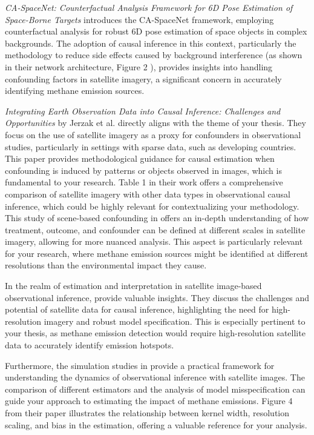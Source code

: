 \textit{CA-SpaceNet: Counterfactual Analysis Framework for 6D Pose Estimation of Space-Borne Targets} \cite{wang_ca-spacenet_2022} introduces the CA-SpaceNet framework, employing counterfactual analysis for robust 6D pose estimation of space objects in complex backgrounds. The adoption of causal inference in this context, particularly the methodology to reduce side effects caused by background interference (as shown in their network architecture, Figure 2 \cite[Figure 2]{wang_ca-spacenet_2022}), provides insights into handling confounding factors in satellite imagery, a significant concern in accurately identifying methane emission sources.

\textit{Integrating Earth Observation Data into Causal Inference: Challenges and Opportunities} by Jerzak et al. \cite{jerzak_integrating_2023} directly aligns with the theme of your thesis. They focus on the use of satellite imagery as a proxy for confounders in observational studies, particularly in settings with sparse data, such as developing countries. This paper provides methodological guidance for causal estimation when confounding is induced by patterns or objects observed in images, which is fundamental to your research. Table 1 in their work \cite[Table 1]{jerzak_integrating_2023} offers a comprehensive comparison of satellite imagery with other data types in observational causal inference, which could be highly relevant for contextualizing your methodology. This study of scene-based confounding in \cite{jerzak_integrating_2023} offers an in-depth understanding of how treatment, outcome, and confounder can be defined at different scales in satellite imagery, allowing for more nuanced analysis. This aspect is particularly relevant for your research, where methane emission sources might be identified at different resolutions than the environmental impact they cause.

In the realm of estimation and interpretation in satellite image-based observational inference, provide valuable insights. They discuss the challenges and potential of satellite data for causal inference, highlighting the need for high-resolution imagery and robust model specification. This is especially pertinent to your thesis, as methane emission detection would require high-resolution satellite data to accurately identify emission hotspots.

Furthermore, the simulation studies in \cite{jerzak_integrating_2023} provide a practical framework for understanding the dynamics of observational inference with satellite images. The comparison of different estimators and the analysis of model misspecification can guide your approach to estimating the impact of methane emissions. Figure 4 from their paper \cite[Figure 4]{jerzak_integrating_2023} illustrates the relationship between kernel width, resolution scaling, and bias in the estimation, offering a valuable reference for your analysis.

